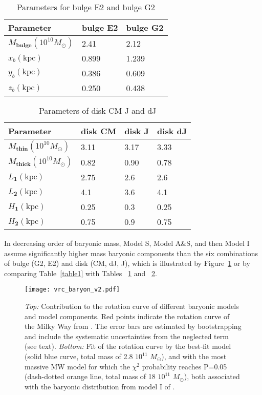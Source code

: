 \documentclass{aa}
\begin{document}
\begin{table}
\centering
\caption{Parameters for bulge E2 and bulge G2}
\begin{tabular}{l l l}
    \hline\hline
    Parameter & bulge E2 & bulge G2 \\
    \hline
    $M_{\mathbf{bulge}} (10^{10} M_{\odot})$ & 2.41 & 2.12  \\
    $x_b(\mathrm{kpc})$    &0.899&1.239\\
    $y_b(\mathrm{kpc})$    &0.386&0.609\\
    $z_b(\mathrm{kpc})$    &0.250&0.438\\
    \hline
    \end{tabular}
\label{table2}
\end{table}

\begin{table}
\centering
\caption{Parameters of disk CM J and dJ}
\begin{tabular}{l l l l}
     \hline\hline
    Parameter & disk CM  & disk J & disk dJ\\
    \hline
    $M_{\mathbf{thin}} (10^{10} M_{\odot})$ & 3.11&3.17&3.33 \\
    $M_{\mathbf{thick}} (10^{10} M_{\odot})$ &0.82&0.90&0.78\\
    $L_{\mathbf{1}} (\mathrm{kpc})$ &2.75&2.6&2.6\\
    $L_{\mathbf{2}} (\mathrm{kpc})$ &4.1&3.6&4.1\\
    $H_{\mathbf{1}} (\mathrm{kpc})$ &0.25&0.3&0.25\\
    $H_{\mathbf{2}} (\mathrm{kpc})$ &0.75&0.9&0.75\\
    \hline 
    \end{tabular}
\label{table3}
\end{table}

In decreasing order of baryonic mass, Model S, Model A\&S, and then Model I assume significantly higher mass baryonic components than the six combinations of bulge (G2, E2) and disk (CM, dJ, J), which is illustrated by Figure~\ref{figure1} or by comparing Table~\ref{table1} with Tables ~\ref{table2} and ~\ref{table3}.

\begin{figure}
\texttt{[image: vrc\_baryon\_v2.pdf]}
    \caption{{\it Top: } Contribution to the rotation curve of different baryonic models and model components. Red points indicate the rotation curve of the Milky Way from \citet{Eilers2019}. The error bars are estimated by bootstrapping and include the systematic uncertainties from the neglected term (see text). {\it Bottom: } Fit of the rotation curve by the best-fit model (solid blue curve, total mass of 2.8 $10^{11}$ $M_{\odot}$), and with the most massive MW model for which the $\chi^2$ probability reaches P=0.05 (dash-dotted orange line, total mass of 18 $10^{11}$ $M_{\odot}$), both associated with the baryonic distribution from model I of \citet{Pouliasis2017}.}
    \label{figure1}
\end{figure}
\end{document}
